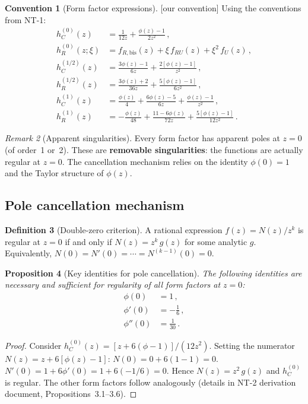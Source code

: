 \documentclass[12pt,a4paper]{article}
\newtheorem{proposition}{Proposition}[section]
\theoremstyle{definition}
\newtheorem{definition}[proposition]{Definition}
\newtheorem{convention}[proposition]{Convention}
\theoremstyle{remark}
\newtheorem{remark}[proposition]{Remark}
\newcommand{\oursign}{\textcolor{teal!80!black}{\textsf{[our convention]}}}
\begin{document}
\begin{convention}[Form factor expressions]
\label{conv:form-factors}
\oursign\;
Using the conventions from NT-1:
\begin{align}
  h_C^{(0)}(z) &= \frac{1}{12z} + \frac{\phi(z)-1}{2z^2}\,,
    \label{eq:hC0}\\[4pt]
  h_R^{(0)}(z;\xi) &= f_{R,\text{bis}}(z) + \xi\,f_{RU}(z)
    + \xi^2\,f_U(z)\,,
    \label{eq:hR0}\\[4pt]
  h_C^{(1/2)}(z) &= \frac{3\phi(z)-1}{6z}
    + \frac{2[\phi(z)-1]}{z^2}\,,
    \label{eq:hC12}\\[4pt]
  h_R^{(1/2)}(z) &= \frac{3\phi(z)+2}{36z}
    + \frac{5[\phi(z)-1]}{6z^2}\,,
    \label{eq:hR12}\\[4pt]
  h_C^{(1)}(z) &= \frac{\phi(z)}{4}
    + \frac{6\phi(z)-5}{6z}
    + \frac{\phi(z)-1}{z^2}\,,
    \label{eq:hC1}\\[4pt]
  h_R^{(1)}(z) &= -\frac{\phi(z)}{48}
    + \frac{11-6\phi(z)}{72z}
    + \frac{5[\phi(z)-1]}{12z^2}\,.
    \label{eq:hR1}
\end{align}
\end{convention}

\begin{remark}[Apparent singularities]
Every form factor has apparent poles at $z=0$ (of order~1 or~2).
These are \textbf{removable singularities}: the functions are
actually regular at $z=0$.  The cancellation mechanism relies on
the identity $\phi(0) = 1$ and the Taylor structure of $\phi(z)$.
\end{remark}


\subsection{Pole cancellation mechanism}

\begin{definition}[Double-zero criterion]
\label{def:double-zero}
A rational expression $f(z) = N(z)/z^k$ is regular at $z=0$
if and only if $N(z) = z^k\, g(z)$ for some analytic $g$.
Equivalently, $N(0) = N'(0) = \cdots = N^{(k-1)}(0) = 0$.
\end{definition}

\begin{proposition}[Key identities for pole cancellation]
\label{prop:key-identities}
The following identities are necessary and sufficient for
regularity of all form factors at $z=0$:
\begin{align}
  \phi(0) &= 1\,,\label{eq:key1}\\
  \phi'(0) &= -\frac{1}{6}\,,\label{eq:key2}\\
  \phi''(0) &= \frac{1}{30}\,.\label{eq:key3}
\end{align}
\end{proposition}
\begin{proof}
Consider $h_C^{(0)}(z) = [z + 6(\phi-1)]/(12z^2)$.
Setting the numerator $N(z) = z + 6[\phi(z)-1]$:
$N(0) = 0 + 6(1-1) = 0$.
$N'(0) = 1 + 6\phi'(0) = 1 + 6(-1/6) = 0$.
Hence $N(z) = z^2\, g(z)$ and $h_C^{(0)}$ is regular.
The other form factors follow analogously (details in
NT-2 derivation document, Propositions~3.1--3.6).
\end{proof}
\end{document}
